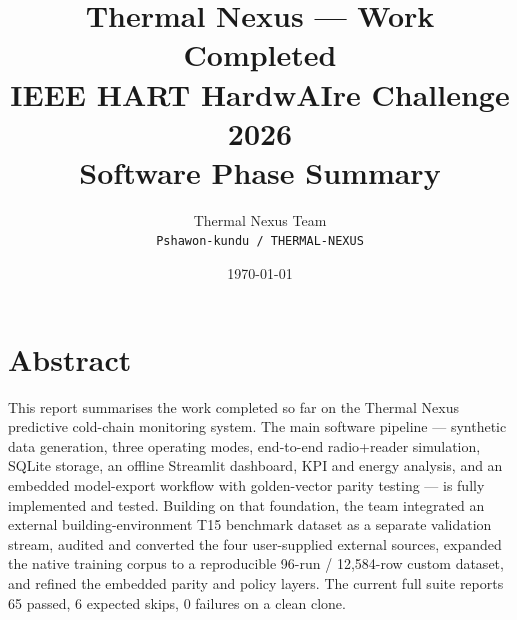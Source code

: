 \documentclass[11pt,a4paper]{article}
\title{\textbf{Thermal Nexus --- Work Completed}\\
\large IEEE HART HardwAIre Challenge 2026 \\ Software Phase Summary}
\author{Thermal Nexus Team \\ \texttt{Pshawon-kundu / THERMAL-NEXUS}}
\date{\today}
\begin{document}
\maketitle
\thispagestyle{fancy}

\section*{Abstract}
This report summarises the work completed so far on the Thermal Nexus predictive
cold-chain monitoring system. The main software pipeline --- synthetic data
generation, three operating modes, end-to-end radio+reader simulation, SQLite
storage, an offline Streamlit dashboard, KPI and energy analysis, and an
embedded model-export workflow with golden-vector parity testing --- is fully
implemented and tested. Building on that foundation, the team integrated an
external building-environment T15 benchmark dataset as a separate validation
stream, audited and converted the four user-supplied external sources, expanded
the native training corpus to a reproducible 96-run / 12{,}584-row
custom dataset, and refined the embedded parity and policy layers. The current
full suite reports 65 passed, 6 expected skips, 0 failures on a clean clone.
\end{document}
